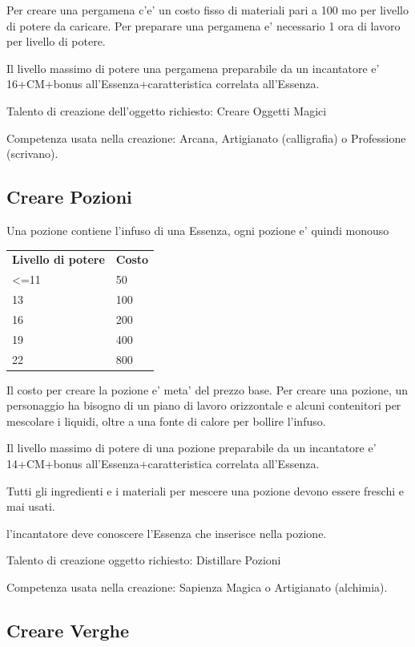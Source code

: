 \documentclass[a4paper,11pt,twoside,openany]{book}
\begin{document}
{		Per creare una pergamena c'e' un costo fisso di materiali pari a 100 mo per livello di potere da caricare. Per preparare una pergamena e' necessario 1 ora di lavoro per livello di potere.
		
		Il livello massimo di potere una pergamena preparabile da un incantatore e' 16+CM+bonus all'Essenza+caratteristica correlata all'Essenza.
		
		Talento di creazione dell'oggetto richiesto: Creare Oggetti Magici
		
		Competenza usata nella creazione: Arcana, Artigianato (calligrafia) o Professione (scrivano).
		
		\subsection{Creare Pozioni}
		
		Una pozione contiene l'infuso di una Essenza, ogni pozione e' quindi monouso
		
		\bigskip
		
		\begin{tabular}{ll}
			\toprule
			\textbf{Livello di potere} & \textbf{Costo}\tabularnewline
			\textless=11 & 50\tabularnewline
			13 & 100\tabularnewline
			16 & 200\tabularnewline
			19 & 400\tabularnewline
			22 & 800\tabularnewline
		\end{tabular}
		
		\bigskip
		
		Il costo per creare la pozione e' meta' del prezzo base. Per creare una pozione, un personaggio ha bisogno di un piano di lavoro orizzontale e alcuni contenitori per mescolare i liquidi, oltre a una fonte di calore per bollire l'infuso.
		
		Il livello massimo di potere di una pozione preparabile da un incantatore e' 14+CM+bonus all'Essenza+caratteristica correlata all'Essenza.
		
		Tutti gli ingredienti e i materiali per mescere una pozione devono essere freschi e mai usati.
		
		l'incantatore deve conoscere l'Essenza che inserisce nella pozione.
		
		Talento di creazione oggetto richiesto: Distillare Pozioni
		
		Competenza usata nella creazione: Sapienza Magica o Artigianato (alchimia).
		
		\subsection{Creare Verghe}
		
}
\end{document}
